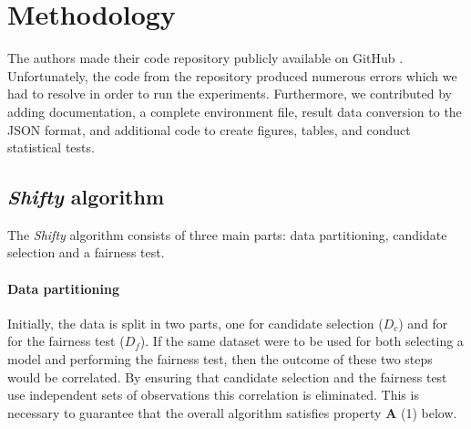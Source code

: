 

\section{Methodology}
The authors made their code repository publicly available on GitHub \cite{sgiguere2022github}. Unfortunately, the code from the repository produced numerous errors which we had to resolve in order to run the experiments.  Furthermore, we contributed by adding documentation, a complete environment file, result data conversion to the JSON format, and additional code to create figures, tables, and conduct statistical tests.


\subsection{\textit{Shifty} algorithm}

The \textit{Shifty} algorithm consists of three main parts: data partitioning, candidate selection and a fairness test.

\paragraph{Data partitioning} Initially, the data is split in two parts, one for candidate selection ($D_c$) and for for the fairness test ($D_f$). If the same dataset were to be used for both selecting a model and performing the fairness test, then the outcome of these two steps would be correlated. By ensuring that candidate selection and the fairness test use independent sets of observations this correlation is eliminated. This is necessary to guarantee that the overall algorithm satisfies property \textbf{A} (1) below.


